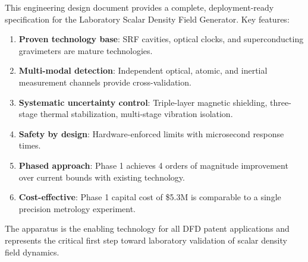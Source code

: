 \documentclass[11pt,a4paper]{article}
\begin{document}
This engineering design document provides a complete,
deployment-ready specification for the Laboratory Scalar Density
Field Generator.  Key features:

\begin{enumerate}[nosep]
\item \textbf{Proven technology base}: SRF cavities, optical
clocks, and superconducting gravimeters are mature technologies.
\item \textbf{Multi-modal detection}: Independent optical, atomic,
and inertial measurement channels provide cross-validation.
\item \textbf{Systematic uncertainty control}: Triple-layer
magnetic shielding, three-stage thermal stabilization,
multi-stage vibration isolation.
\item \textbf{Safety by design}: Hardware-enforced limits with
microsecond response times.
\item \textbf{Phased approach}: Phase 1 achieves 4 orders of
magnitude improvement over current bounds with existing technology.
\item \textbf{Cost-effective}: Phase 1 capital cost of \$5.3M is
comparable to a single precision metrology experiment.
\end{enumerate}

The apparatus is the enabling technology for all DFD patent
applications and represents the critical first step toward
laboratory validation of scalar density field dynamics.
\end{document}
